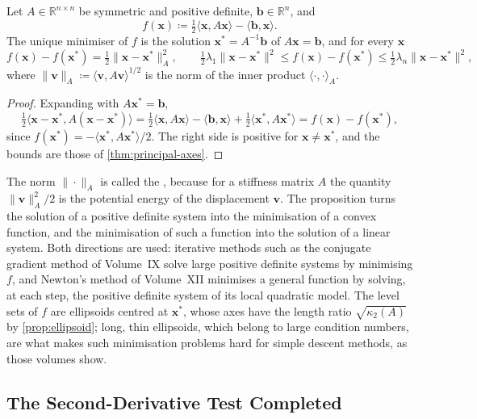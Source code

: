 \begin{proposition}
\label{prop:energy-minimum}
Let $A\in\mathbb R^{n\times n}$ be symmetric and positive definite, $\mathbf b\in\mathbb R^n$, and
\[
f(\mathbf x)\coloneqq\tfrac12\langle\mathbf x,A\mathbf x\rangle-\langle\mathbf b,\mathbf x\rangle .
\]
The unique minimiser of $f$ is the solution $\mathbf x^*=A^{-1}\mathbf b$ of $A\mathbf x=\mathbf b$, and for every $\mathbf x$
\[
f(\mathbf x)-f(\mathbf x^*)=\tfrac12\|\mathbf x-\mathbf x^*\|_A^2,\qquad\tfrac12\lambda_1\|\mathbf x-\mathbf x^*\|^2\le f(\mathbf x)-f(\mathbf x^*)\le\tfrac12\lambda_n\|\mathbf x-\mathbf x^*\|^2,
\]
where $\|\mathbf v\|_A\coloneqq\langle\mathbf v,A\mathbf v\rangle^{1/2}$ is the norm of the inner product $\langle\cdot,\cdot\rangle_A$.
\end{proposition}

\begin{proof}
Expanding with $A\mathbf x^*=\mathbf b$,
\[
\tfrac12\langle\mathbf x-\mathbf x^*,A(\mathbf x-\mathbf x^*)\rangle=\tfrac12\langle\mathbf x,A\mathbf x\rangle-\langle\mathbf b,\mathbf x\rangle+\tfrac12\langle\mathbf x^*,A\mathbf x^*\rangle=f(\mathbf x)-f(\mathbf x^*),
\]
since $f(\mathbf x^*)=-\langle\mathbf x^*,A\mathbf x^*\rangle/2$. The right side is positive for $\mathbf x\ne\mathbf x^*$, and the bounds are those of \cref{thm:principal-axes}.
\end{proof}

The norm $\|\cdot\|_A$ is called the , because for a stiffness matrix $A$ the quantity $\|\mathbf v\|_A^2/2$ is the potential energy of the displacement $\mathbf v$. The proposition turns the solution of a positive definite system into the minimisation of a convex function, and the minimisation of such a function into the solution of a linear system. Both directions are used: iterative methods such as the conjugate gradient method of Volume~IX solve large positive definite systems by minimising $f$, and Newton's method of Volume~XII minimises a general function by solving, at each step, the positive definite system of its local quadratic model. The level sets of $f$ are ellipsoids centred at $\mathbf x^*$, whose axes have the length ratio $\sqrt{\kappa_2(A)}$ by \cref{prop:ellipsoid}; long, thin ellipsoids, which belong to large condition numbers, are what makes such minimisation problems hard for simple descent methods, as those volumes show.

\subsection{The Second-Derivative Test Completed}

